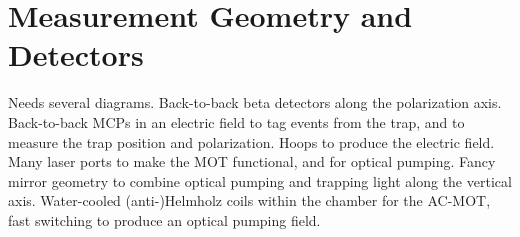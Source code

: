 	
	
\section{Measurement Geometry and Detectors}
	Needs several diagrams.  Back-to-back beta detectors along the polarization axis.  Back-to-back MCPs in an electric field to tag events from the trap, and to measure the trap position and polarization.  Hoops to produce the electric field.  Many laser ports to make the MOT functional, and for optical pumping.  Fancy mirror geometry to combine optical pumping and trapping light along the vertical axis.  Water-cooled (anti-)Helmholz coils within the chamber for the AC-MOT, fast switching to produce an optical pumping field.  

